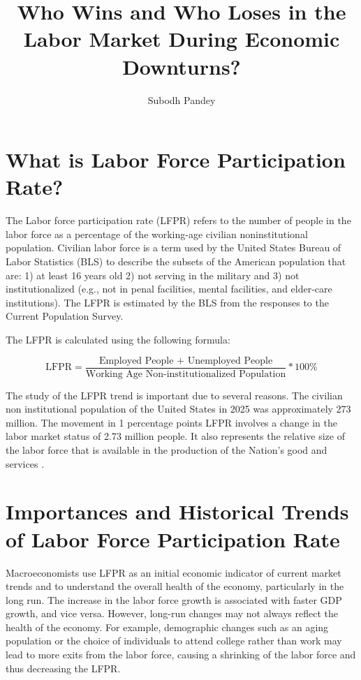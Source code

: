 \documentclass[letterpaper]{scrartcl}
\begin{document}
    \onehalfspacing
    \title{Who Wins and Who Loses in the  Labor Market During Economic Downturns?}
    \author{Subodh Pandey}
    \date{}

	\maketitle



    \section*{What is Labor Force Participation Rate?}  

\quad The Labor force participation rate (LFPR) refers to the number of people in the labor force as a percentage of the working-age civilian noninstitutional population. Civilian labor force is a term used by the United States Bureau of Labor Statistics (BLS) to describe the subsets of the American population that are: 1) at least 16 years old 2) not serving in the military and 3) not institutionalized (e.g., not in penal facilities, mental facilities, and elder-care institutions). The LFPR is estimated by the BLS from the responses to the Current Population Survey.

The LFPR is calculated using the following formula:

$$\text{LFPR} = \frac{\text{Employed People + Unemployed People}}{\text{Working Age Non-institutionalized Population}} * 100 \%$$

The study of the LFPR trend is important due to several reasons.  The civilian non institutional population of the United States in 2025 was approximately 273 million. The movement in 1 percentage points LFPR involves a change in the labor market status of 2.73 million people. It also represents the relative size of the labor force that is available in the production of the Nation's good and services \parencite{mosisa2006trends}.

\section*{Importances and Historical Trends of Labor Force Participation Rate}

\quad Macroeconomists use LFPR as an initial economic indicator of current market trends and to understand the overall health of the economy, particularly in the long run. The increase in the labor force growth is associated with faster GDP growth, and vice versa. However, long-run changes may not always reflect the health of the economy. For example, demographic changes such as an aging population or the choice of individuals to attend college rather than work may lead to more exits from the labor force, causing a shrinking of the labor force and thus decreasing the LFPR.
\end{document}
